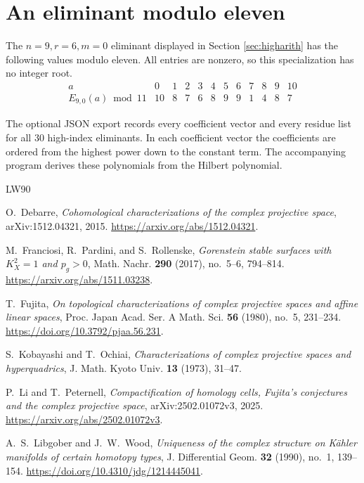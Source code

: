 \documentclass[11pt,reqno,letterpaper]{amsart}
\theoremstyle{definition}
\numberwithin{equation}{section}
\begin{document}
\clearpage
\section{An eliminant modulo eleven}
The $n=9,r=6,m=0$ eliminant displayed in Section \ref{sec:higharith}
has the following values modulo eleven.
All entries are nonzero, so this specialization has no integer root.
\[
\begin{array}{c|rrrrrrrrrrr}
a&0&1&2&3&4&5&6&7&8&9&10\\\hline
E_{9,0}(a)\bmod11&
10&8&7&6&8&9&9&1&4&8&7\end{array}\]

The optional JSON export records every coefficient vector and every residue
list for all 30 high-index eliminants. In each coefficient vector the
coefficients are ordered from the highest power down to the constant term.
The accompanying program derives these polynomials from the Hilbert
polynomial.


\begin{thebibliography}{LW90}

O.~Debarre,
\emph{Cohomological characterizations of the complex projective space},
arXiv:1512.04321, 2015.
\url{https://arxiv.org/abs/1512.04321}.

M.~Franciosi, R.~Pardini, and S.~Rollenske,
\emph{Gorenstein stable surfaces with $K_X^2=1$ and $p_g>0$},
Math. Nachr. \textbf{290} (2017), no.~5--6, 794--814.
\url{https://arxiv.org/abs/1511.03238}.

T.~Fujita,
\emph{On topological characterizations of complex projective spaces and
affine linear spaces},
Proc. Japan Acad. Ser. A Math. Sci. \textbf{56} (1980), no.~5, 231--234.
\url{https://doi.org/10.3792/pjaa.56.231}.

S.~Kobayashi and T.~Ochiai,
\emph{Characterizations of complex projective spaces and hyperquadrics},
J. Math. Kyoto Univ. \textbf{13} (1973), 31--47.

P.~Li and T.~Peternell,
\emph{Compactification of homology cells, Fujita's conjectures and the
complex projective space},
arXiv:2502.01072v3, 2025.
\url{https://arxiv.org/abs/2502.01072v3}.

A.~S.~Libgober and J.~W.~Wood,
\emph{Uniqueness of the complex structure on K\"ahler manifolds of certain
homotopy types},
J. Differential Geom. \textbf{32} (1990), no.~1, 139--154.
\url{https://doi.org/10.4310/jdg/1214445041}.

\end{thebibliography}
\end{document}
